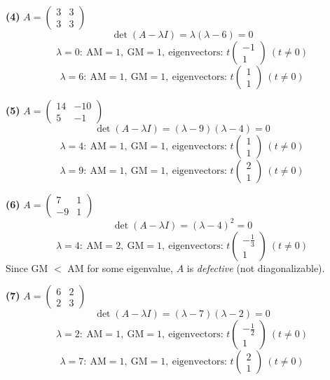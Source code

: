 \noindent\textbf{(4)} $A=\begin{pmatrix}3 & 3 \\ 3 & 3\end{pmatrix}$
\[ \det(A-\lambda I)=\lambda \left(\lambda - 6\right)=0 \]
\[ \lambda=0:\ \text{AM}=1,\ \text{GM}=1,\ \text{eigenvectors: }t\begin{pmatrix}-1 \\ 1\end{pmatrix}\ (t\neq0) \]
\[ \lambda=6:\ \text{AM}=1,\ \text{GM}=1,\ \text{eigenvectors: }t\begin{pmatrix}1 \\ 1\end{pmatrix}\ (t\neq0) \]

\noindent\textbf{(5)} $A=\begin{pmatrix}14 & -10 \\ 5 & -1\end{pmatrix}$
\[ \det(A-\lambda I)=\left(\lambda - 9\right) \left(\lambda - 4\right)=0 \]
\[ \lambda=4:\ \text{AM}=1,\ \text{GM}=1,\ \text{eigenvectors: }t\begin{pmatrix}1 \\ 1\end{pmatrix}\ (t\neq0) \]
\[ \lambda=9:\ \text{AM}=1,\ \text{GM}=1,\ \text{eigenvectors: }t\begin{pmatrix}2 \\ 1\end{pmatrix}\ (t\neq0) \]

\noindent\textbf{(6)} $A=\begin{pmatrix}7 & 1 \\ -9 & 1\end{pmatrix}$
\[ \det(A-\lambda I)=\left(\lambda - 4\right)^{2}=0 \]
\[ \lambda=4:\ \text{AM}=2,\ \text{GM}=1,\ \text{eigenvectors: }t\begin{pmatrix}- \frac{1}{3} \\ 1\end{pmatrix}\ (t\neq0) \]
Since GM $<$ AM for some eigenvalue, $A$ is \emph{defective} (not diagonalizable).


\noindent\textbf{(7)} $A=\begin{pmatrix}6 & 2 \\ 2 & 3\end{pmatrix}$
\[ \det(A-\lambda I)=\left(\lambda - 7\right) \left(\lambda - 2\right)=0 \]
\[ \lambda=2:\ \text{AM}=1,\ \text{GM}=1,\ \text{eigenvectors: }t\begin{pmatrix}- \frac{1}{2} \\ 1\end{pmatrix}\ (t\neq0) \]
\[ \lambda=7:\ \text{AM}=1,\ \text{GM}=1,\ \text{eigenvectors: }t\begin{pmatrix}2 \\ 1\end{pmatrix}\ (t\neq0) \]

